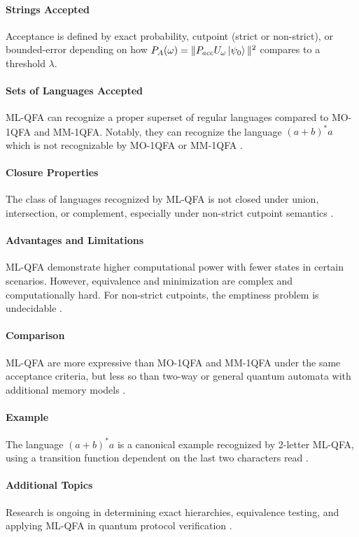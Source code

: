 \paragraph{Strings Accepted}
Acceptance is defined by exact probability, cutpoint (strict or non-strict), or bounded-error depending on how $P_A(\omega) = \| P_{acc} U_\omega \ket{\psi_0} \|^2$ compares to a threshold $\lambda$.

\paragraph{Sets of Languages Accepted}
ML-QFA can recognize a proper superset of regular languages compared to MO-1QFA and MM-1QFA. Notably, they can recognize the language $(a + b)^*a$ which is not recognizable by MO-1QFA or MM-1QFA \cite{belovs2007multi}.

\paragraph{Closure Properties}
The class of languages recognized by ML-QFA is not closed under union, intersection, or complement, especially under non-strict cutpoint semantics \cite{qiu2009hierarchy}.

\paragraph{Advantages and Limitations}
ML-QFA demonstrate higher computational power with fewer states in certain scenarios. However, equivalence and minimization are complex and computationally hard. For non-strict cutpoints, the emptiness problem is undecidable \cite{qiu2008decidability}.

\paragraph{Comparison}
ML-QFA are more expressive than MO-1QFA and MM-1QFA under the same acceptance criteria, but less so than two-way or general quantum automata with additional memory models \cite{qiu2011multi}.

\paragraph{Example}
The language $(a + b)^*a$ is a canonical example recognized by 2-letter ML-QFA, using a transition function dependent on the last two characters read \cite{belovs2007multi}.

\paragraph{Additional Topics}
Research is ongoing in determining exact hierarchies, equivalence testing, and applying ML-QFA in quantum protocol verification \cite{lin2012equivalence, qiu2008decidability}.

